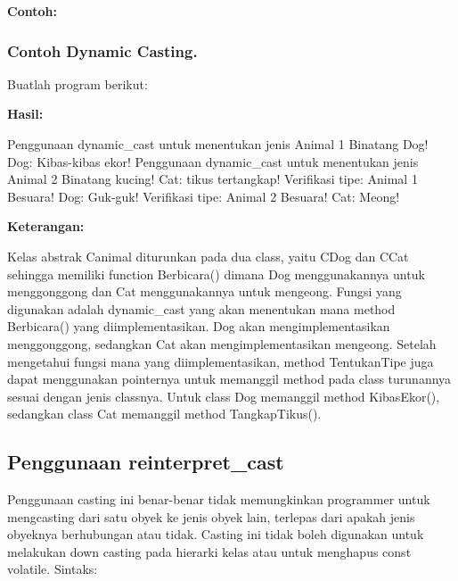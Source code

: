 

\textbf{Contoh:}



\subsubsection*{Contoh Dynamic Casting.}

Buatlah program berikut:



\textbf{Hasil:}

\begin{lcverbatim}
Penggunaan dynamic_cast untuk menentukan jenis Animal 1
Binatang Dog!
Dog: Kibas-kibas ekor!
Penggunaan dynamic_cast untuk menentukan jenis Animal 2
Binatang kucing!
Cat: tikus tertangkap!
Verifikasi tipe: Animal 1 Besuara!
Dog: Guk-guk!
Verifikasi tipe: Animal 2 Besuara!
Cat: Meong!
\end{lcverbatim}
\textbf{Keterangan:}

Kelas abstrak Canimal diturunkan pada dua class, yaitu CDog dan CCat
sehingga memiliki function Berbicara() dimana Dog menggunakannya untuk
menggonggong dan Cat menggunakannya untuk mengeong. Fungsi yang
digunakan adalah dynamic\_cast yang akan menentukan mana method
Berbicara() yang diimplementasikan. Dog akan mengimplementasikan
menggonggong, sedangkan Cat akan mengimplementasikan mengeong. Setelah
mengetahui fungsi mana yang diimplementasikan, method TentukanTipe juga
dapat menggunakan pointernya untuk memanggil method pada class
turunannya sesuai dengan jenis classnya. Untuk class Dog memanggil
method KibasEkor(), sedangkan class Cat memanggil method TangkapTikus().

\subsection{Penggunaan reinterpret\_cast}\label{penggunaan-reinterpretux5fcast}

Penggunaan casting ini benar-benar tidak memungkinkan programmer untuk
mengcasting dari satu obyek ke jenis obyek lain, terlepas dari apakah
jenis obyeknya berhubungan atau tidak. Casting ini tidak boleh digunakan
untuk melakukan down casting pada hierarki kelas atau untuk menghapus
const volatile. Sintaks:

